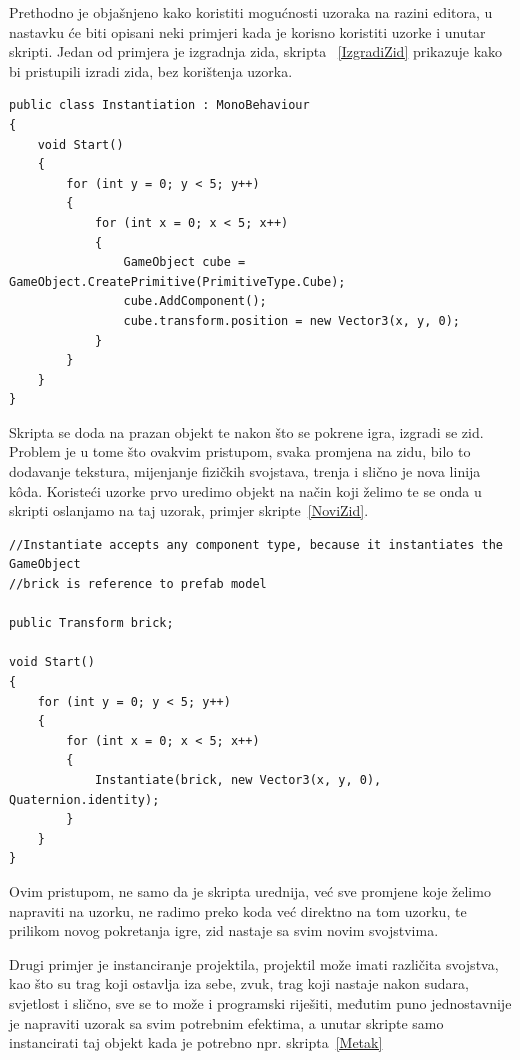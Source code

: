 Prethodno je objašnjeno kako koristiti mogućnosti uzoraka na razini editora, u nastavku će biti opisani neki primjeri kada je korisno koristiti uzorke i unutar skripti. Jedan od primjera je izgradnja zida, skripta ~\ref{IzgradiZid} prikazuje kako bi pristupili izradi zida, bez korištenja uzorka.

\begin{lstlisting}[caption={Skripta za izradu zida}, label=IzgradiZid]
public class Instantiation : MonoBehaviour 
{
    void Start()
    {
        for (int y = 0; y < 5; y++) 
        {
            for (int x = 0; x < 5; x++) 
            {
                GameObject cube = GameObject.CreatePrimitive(PrimitiveType.Cube);
                cube.AddComponent();
                cube.transform.position = new Vector3(x, y, 0);
            }
        }
    }
}
\end{lstlisting}

Skripta se doda na prazan objekt te nakon što se pokrene igra, izgradi se zid. Problem je u tome što ovakvim pristupom, svaka promjena na zidu, bilo to dodavanje tekstura, mijenjanje fizičkih svojstava, trenja i slično je nova linija k\^oda.
Koristeći uzorke prvo uredimo objekt na način koji želimo te se onda u skripti oslanjamo na taj uzorak, primjer skripte~\ref{NoviZid}.

\begin{lstlisting}[caption={Skripta za izradu zida koristeći uzorke}, label=NoviZid]
//Instantiate accepts any component type, because it instantiates the GameObject 
//brick is reference to prefab model

public Transform brick;

void Start() 
{
    for (int y = 0; y < 5; y++)
    {
        for (int x = 0; x < 5; x++) 
        {
            Instantiate(brick, new Vector3(x, y, 0), Quaternion.identity);
        }
    }
}
\end{lstlisting}

Ovim pristupom, ne samo da je skripta urednija, već sve promjene koje želimo napraviti na uzorku, ne radimo preko koda već direktno na tom uzorku, te prilikom novog pokretanja igre, zid nastaje sa svim novim svojstvima.

Drugi primjer je instanciranje projektila, projektil može imati različita svojstva, kao što su trag koji ostavlja iza sebe, zvuk, trag koji nastaje nakon sudara, svjetlost i slično, sve se to može i programski riješiti, međutim puno jednostavnije je napraviti uzorak sa svim potrebnim efektima, a unutar skripte samo instancirati taj objekt kada je potrebno npr. skripta~\ref{Metak}

